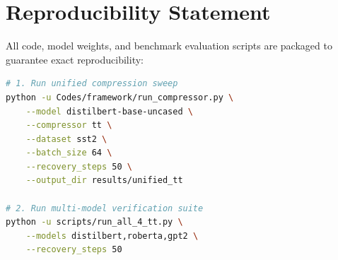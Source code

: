 \section{Reproducibility Statement}
All code, model weights, and benchmark evaluation scripts are packaged to guarantee exact reproducibility:
\begin{lstlisting}[language=bash]
# 1. Run unified compression sweep
python -u Codes/framework/run_compressor.py \
    --model distilbert-base-uncased \
    --compressor tt \
    --dataset sst2 \
    --batch_size 64 \
    --recovery_steps 50 \
    --output_dir results/unified_tt

# 2. Run multi-model verification suite
python -u scripts/run_all_4_tt.py \
    --models distilbert,roberta,gpt2 \
    --recovery_steps 50
\end{lstlisting}
